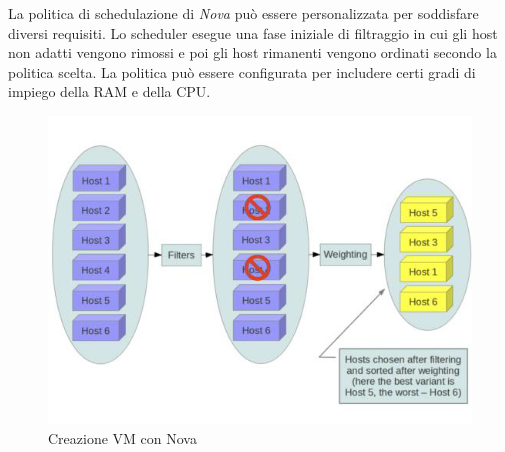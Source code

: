 \documentclass{article}
\begin{document}
La politica di schedulazione di \textit{Nova} può essere personalizzata per soddisfare diversi requisiti. Lo scheduler esegue una fase iniziale di filtraggio in cui gli host non adatti vengono rimossi e poi gli host rimanenti vengono ordinati secondo la politica scelta. La politica può essere configurata per includere certi gradi di impiego della RAM e della CPU.
\begin{figure}[H]
    \centering
    \includegraphics[scale=0.5]{img/nova_policy.png}
    \caption{Creazione VM con Nova}
\end{figure}\noindent
\end{document}
